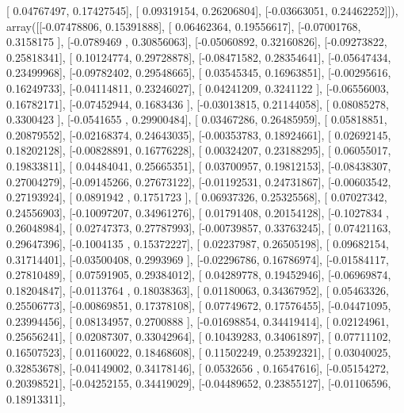 \documentclass{article}
\begin{document}
       [ 0.04767497,  0.17427545],
       [ 0.09319154,  0.26206804],
       [-0.03663051,  0.24462252]]), array([[-0.07478806,  0.15391888],
       [ 0.06462364,  0.19556617],
       [-0.07001768,  0.3158175 ],
       [-0.0789469 ,  0.30856063],
       [-0.05060892,  0.32160826],
       [-0.09273822,  0.25818341],
       [ 0.10124774,  0.29728878],
       [-0.08471582,  0.28354641],
       [-0.05647434,  0.23499968],
       [-0.09782402,  0.29548665],
       [ 0.03545345,  0.16963851],
       [-0.00295616,  0.16249733],
       [-0.04114811,  0.23246027],
       [ 0.04241209,  0.3241122 ],
       [-0.06556003,  0.16782171],
       [-0.07452944,  0.1683436 ],
       [-0.03013815,  0.21144058],
       [ 0.08085278,  0.3300423 ],
       [-0.0541655 ,  0.29900484],
       [ 0.03467286,  0.26485959],
       [ 0.05818851,  0.20879552],
       [-0.02168374,  0.24643035],
       [-0.00353783,  0.18924661],
       [ 0.02692145,  0.18202128],
       [-0.00828891,  0.16776228],
       [ 0.00324207,  0.23188295],
       [ 0.06055017,  0.19833811],
       [ 0.04484041,  0.25665351],
       [ 0.03700957,  0.19812153],
       [-0.08438307,  0.27004279],
       [-0.09145266,  0.27673122],
       [-0.01192531,  0.24731867],
       [-0.00603542,  0.27193924],
       [ 0.0891942 ,  0.1751723 ],
       [ 0.06937326,  0.25325568],
       [ 0.07027342,  0.24556903],
       [-0.10097207,  0.34961276],
       [ 0.01791408,  0.20154128],
       [-0.1027834 ,  0.26048984],
       [ 0.02747373,  0.27787993],
       [-0.00739857,  0.33763245],
       [ 0.07421163,  0.29647396],
       [-0.1004135 ,  0.15372227],
       [ 0.02237987,  0.26505198],
       [ 0.09682154,  0.31714401],
       [-0.03500408,  0.2993969 ],
       [-0.02296786,  0.16786974],
       [-0.01584117,  0.27810489],
       [ 0.07591905,  0.29384012],
       [ 0.04289778,  0.19452946],
       [-0.06969874,  0.18204847],
       [-0.0113764 ,  0.18038363],
       [ 0.01180063,  0.34367952],
       [ 0.05463326,  0.25506773],
       [-0.00869851,  0.17378108],
       [ 0.07749672,  0.17576455],
       [-0.04471095,  0.23994456],
       [ 0.08134957,  0.2700888 ],
       [-0.01698854,  0.34419414],
       [ 0.02124961,  0.25656241],
       [ 0.02087307,  0.33042964],
       [ 0.10439283,  0.34061897],
       [ 0.07711102,  0.16507523],
       [ 0.01160022,  0.18468608],
       [ 0.11502249,  0.25392321],
       [ 0.03040025,  0.32853678],
       [-0.04149002,  0.34178146],
       [ 0.0532656 ,  0.16547616],
       [-0.05154272,  0.20398521],
       [-0.04252155,  0.34419029],
       [-0.04489652,  0.23855127],
       [-0.01106596,  0.18913311],
\end{document}
